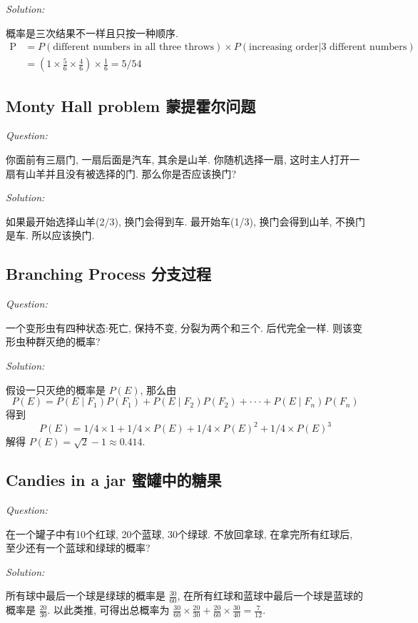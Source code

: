 \documentclass[12pt]{book}
\begin{document}
   \noindent \textit{Solution:} 
   
   概率是三次结果不一样且只按一种顺序. $$\begin{aligned}\mathrm{P}&=P(\text{different numbers in all three throws})\times P(\text{increasing order|3 different numbers})\\&=(1\times\frac{5}{6}\times\frac{4}{6})\times\frac{1}{6}=5/54\end{aligned}$$
 
 \subsection{Monty Hall problem 蒙提霍尔问题}
\noindent \textit{Question:} 
 
 你面前有三扇门, 一扇后面是汽车, 其余是山羊. 你随机选择一扇, 这时主人打开一扇有山羊并且没有被选择的门. 那么你是否应该换门?
 
\noindent \textit{Solution:} 
    
如果最开始选择山羊(2/3), 换门会得到车. 最开始车(1/3), 换门会得到山羊, 不换门是车. 所以应该换门.    
 
 \subsection{Branching Process 分支过程}
\noindent \textit{Question:}  
 
 一个变形虫有四种状态:死亡, 保持不变, 分裂为两个和三个. 后代完全一样. 则该变形虫种群灭绝的概率?
  
\noindent \textit{Solution:} 

假设一只灭绝的概率是 $P(E)$, 那么由$$P(E)=P(E\mid F_1)P(F_1)+P(E\mid F_2)P(F_2)+\cdotp\cdotp\cdotp+P(E\mid F_n)P(F_n)$$ 得到 $$P(E)=1/4\times1+1/4\times P(E)+1/4\times P(E)^2+1/4\times P(E)^3$$ 解得 $P(E)=\sqrt{2}-1\approx0.414$.
 
  \subsection{Candies in a jar 蜜罐中的糖果}
\noindent \textit{Question:}  

在一个罐子中有10个红球, 20个蓝球, 30个绿球. 不放回拿球, 在拿完所有红球后, 至少还有一个蓝球和绿球的概率?

\noindent \textit{Solution:} 

所有球中最后一个球是绿球的概率是 $\frac{30}{60}$, 在所有红球和蓝球中最后一个球是蓝球的概率是 $\frac{20}{30}$. 以此类推, 可得出总概率为 $\frac{30}{60}\times \frac{20}{30}+\frac{20}{60}\times\frac{30}{40}=\frac{7}{12}$.
\end{document}
